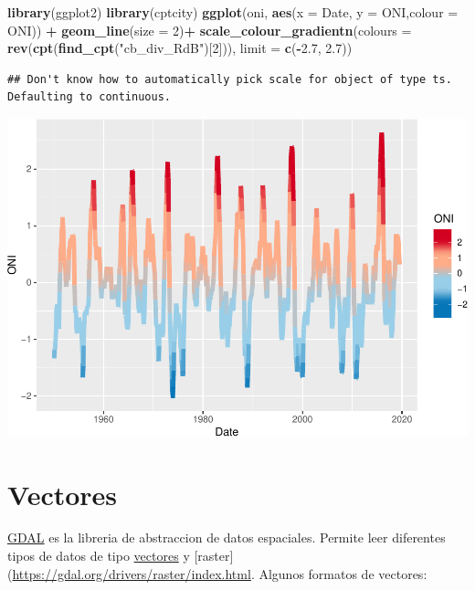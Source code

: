 \documentclass[]{book}
\newenvironment{Shaded}{\begin{snugshade}}{\end{snugshade}}
\newcommand{\DataTypeTok}[1]{\textcolor[rgb]{0.13,0.29,0.53}{#1}}
\newcommand{\DecValTok}[1]{\textcolor[rgb]{0.00,0.00,0.81}{#1}}
\newcommand{\FloatTok}[1]{\textcolor[rgb]{0.00,0.00,0.81}{#1}}
\newcommand{\KeywordTok}[1]{\textcolor[rgb]{0.13,0.29,0.53}{\textbf{#1}}}
\newcommand{\NormalTok}[1]{#1}
\newcommand{\OperatorTok}[1]{\textcolor[rgb]{0.81,0.36,0.00}{\textbf{#1}}}
\newcommand{\StringTok}[1]{\textcolor[rgb]{0.31,0.60,0.02}{#1}}
\begin{document}
\begin{Shaded}
\begin{Highlighting}[]
\KeywordTok{library}\NormalTok{(ggplot2)}
\KeywordTok{library}\NormalTok{(cptcity)}
\KeywordTok{ggplot}\NormalTok{(oni, }
       \KeywordTok{aes}\NormalTok{(}\DataTypeTok{x =}\NormalTok{ Date, }\DataTypeTok{y =}\NormalTok{ ONI,}\DataTypeTok{colour =}\NormalTok{ ONI)) }\OperatorTok{+}\StringTok{ }
\StringTok{  }\KeywordTok{geom_line}\NormalTok{(}\DataTypeTok{size =} \DecValTok{2}\NormalTok{)}\OperatorTok{+}
\KeywordTok{scale_colour_gradientn}\NormalTok{(}\DataTypeTok{colours =} \KeywordTok{rev}\NormalTok{(}\KeywordTok{cpt}\NormalTok{(}\KeywordTok{find_cpt}\NormalTok{(}\StringTok{"cb_div_RdB"}\NormalTok{)[}\DecValTok{2}\NormalTok{])), }
                       \DataTypeTok{limit =} \KeywordTok{c}\NormalTok{(}\OperatorTok{-}\FloatTok{2.7}\NormalTok{, }\FloatTok{2.7}\NormalTok{))}
\end{Highlighting}
\end{Shaded}

\begin{verbatim}
## Don't know how to automatically pick scale for object of type ts. Defaulting to continuous.
\end{verbatim}

\includegraphics{bookdown-demo_files/figure-latex/unnamed-chunk-41-1.pdf}

\hypertarget{vectores}{%
\section{Vectores}\label{vectores}}

\href{https://gdal.org/}{GDAL} es la libreria de abstraccion de datos espaciales. Permite leer diferentes tipos de datos de tipo \href{https://gdal.org/drivers/vector/index.html}{vectores} y {[}raster{]}(\url{https://gdal.org/drivers/raster/index.html}. Algunos formatos de vectores:
\end{document}
